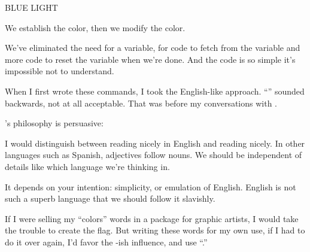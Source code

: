\begin{Code}
BLUE LIGHT
\end{Code}
We establish the color, then we modify the color.

We've eliminated the need for a variable, for code to fetch from the
variable and more code to reset the variable when we're done. And the
code is so simple it's impossible not to understand.

When I first wrote these commands, I took the English-like approach.
``'' sounded backwards, not at all acceptable. That was
before my conversations with
.

\begin{interview}
's philosophy is persuasive:
\begin{tfquot}
I would distinguish between reading nicely in English and reading nicely.
In other languages such as Spanish, adjectives follow nouns. We should be
independent of details like which language we're thinking in.

It depends on your intention: simplicity, or emulation of English. English
is not such a superb language that we should follow it slavishly.
\end{tfquot}
\end{interview}
If I were selling my ``colors'' words in a package for graphic artists, I
would take the trouble to create the flag. But writing these words for my
own use, if I had to do it over again, I'd favor the -ish
influence, and use ``.''%
%
%
%

